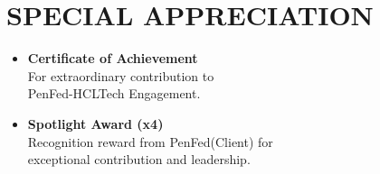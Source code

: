 \section{SPECIAL APPRECIATION}
\begin{minipage}[t]{0.45\textwidth}
\begin{itemize}
\item \textbf{Certificate of Achievement}\\
For extraordinary contribution to\\
PenFed-HCLTech Engagement.
\end{itemize}
\end{minipage}\hfill
\begin{minipage}[t]{0.5\textwidth}
\begin{itemize}
\item \textbf{Spotlight Award (x4)}\\
Recognition reward from PenFed(Client) for \\
exceptional contribution and leadership.
\end{itemize}
\end{minipage}\hfill

